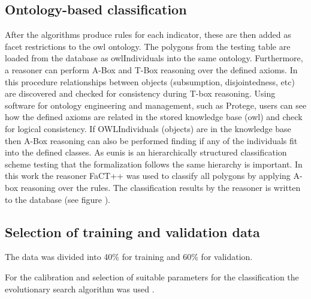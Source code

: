 \documentclass[authoryear,review,12pt,number]{elsarticle}
\begin{document}
\subsection{Ontology-based classification}
\label{subsec:Onto_classification}
After the algorithms produce rules for each indicator, these are then added as
facet restrictions to the \gls{owl} ontology. The polygons from the testing
table are loaded from the database as \gls{owl}Individuals into the same
ontology. Furthermore, a reasoner can perform A-Box and T-Box reasoning over the
defined axioms. In this procedure relationships between objects (subsumption,
disjointedness, etc) are discovered and checked for consistency during T-box
reasoning. Using software for ontology engineering and management, such as
Protege, users can see how the defined axioms are related in the stored
knowledge base (\gls{owl}) and check for logical consistency. If OWLIndividuals
(objects) are in the knowledge base then A-Box reasoning can also be performed
finding if any of the individuals fit into the defined classes. As \gls{eunis}
is an hierarchically structured classification scheme testing that the
formalization follows the same hierarchy is important.
In this work the reasoner FaCT++ was used to classify all polygons by applying
A-box reasoning over the rules. The classification results by the reasoner is
written to the database (see figure \label{fig:full_workflow}).

\subsection{Selection of training and validation data}
\label{subsec:Selection_of_training_validation_data}
The data was divided into 40\% for training and 60\% for validation. %

For the calibration and selection of suitable parameters for the classification
the evolutionary search algorithm was used .%
\end{document}
